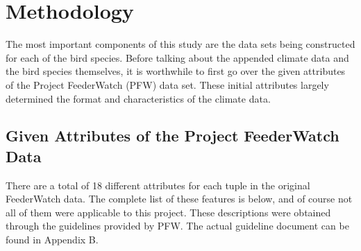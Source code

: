 \chapter{Methodology}

The most important components of this study are the data sets being constructed for each of the bird species. Before talking about the appended climate data and the bird species themselves, it is worthwhile to first go over the given attributes of the Project FeederWatch (PFW) data set. These initial attributes largely determined the format and characteristics of the climate data.

\section{Given Attributes of the Project FeederWatch Data}

There are a total of 18 different attributes for each tuple in the original FeederWatch data. The complete list of these features is below, and of course not all of them were applicable to this project. These descriptions were obtained through the guidelines provided by PFW. The actual guideline document can be found in Appendix B.

